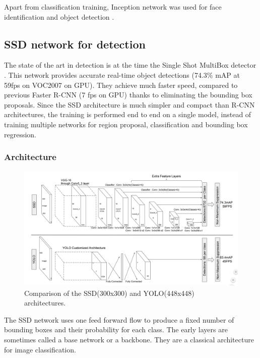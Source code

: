 \documentclass[a4paper,11pt,titlepage,twoside]{article}
\numberwithin{figure}{section}
\begin{document}
Apart from classification training, Inception network was used for face identification \cite{facenet} and object detection \cite{ning2017inception, szegedy2014scalable}.

\subsection{SSD network for detection}
\label{sec:ssd}

The state of the art in detection is at the time the Single Shot MultiBox detector \cite{liu2016ssd}. This network provides accurate real-time object detections (74.3\% mAP at 59fps on VOC2007 on GPU). They achieve much faster speed, compared to previous Faster R-CNN (7 fps on GPU) thanks to eliminating the bounding box proposals. Since the SSD architecture is much simpler and compact than R-CNN architectures, the training is performed end to end on a single model, instead of training multiple networks for region proposal, classification and bounding box regression.

\subsubsection{Architecture}

\begin{figure}[h!]
\centering
\includegraphics[width=1\linewidth]{fig/SSDvsYOLO.png}
\caption{Comparison of the SSD\cite{liu2016ssd}(300x300) and YOLO\cite{redmon2016you}(448x448) architectures.}
\label{fig:ssd_vs_yolo}
\end{figure}

The SSD network uses one feed forward flow to produce a fixed number of bounding boxes and their probability for each class. The early layers are sometimes called a base network or a backbone. They are a classical architecture for image classification. 
\end{document}
